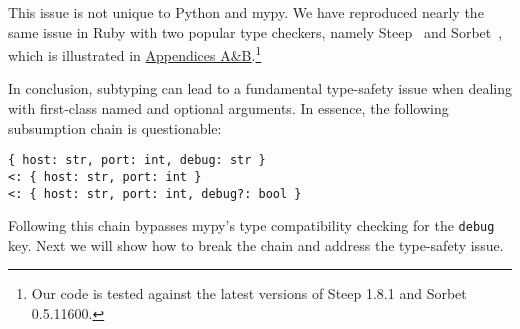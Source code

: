 This issue is not unique to Python and mypy. We have reproduced nearly the same
issue in Ruby with two popular type checkers, namely Steep~\citep{steep} and
Sorbet~\citep{sorbet}, which is illustrated in \hyperref[sec:ruby]{Appendices
A\&B}.\footnote{Our code is tested against the latest versions of Steep 1.8.1
and Sorbet 0.5.11600.}

In conclusion, subtyping can lead to a fundamental type-safety issue when
dealing with first-class named and optional arguments. In essence, the following
subsumption chain is questionable:
\begin{lstlisting}[language={[3]Python}]
   { host: str, port: int, debug: str }
<: { host: str, port: int }
<: { host: str, port: int, debug?: bool }
\end{lstlisting}
Following this chain bypasses mypy's type compatibility checking for the
\lstinline{debug} key. Next we will show how to break the chain and address the
type-safety issue.

